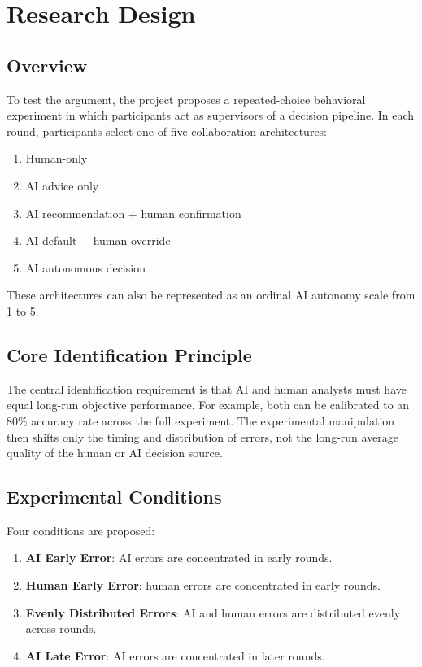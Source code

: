 \section{Research Design}

\subsection{Overview}

To test the argument, the project proposes a repeated-choice behavioral experiment in which participants act as supervisors of a decision pipeline. In each round, participants select one of five collaboration architectures:

\begin{enumerate}[label=\arabic*.]
    \item Human-only
    \item AI advice only
    \item AI recommendation + human confirmation
    \item AI default + human override
    \item AI autonomous decision
\end{enumerate}

These architectures can also be represented as an ordinal AI autonomy scale from 1 to 5.

\subsection{Core Identification Principle}

The central identification requirement is that AI and human analysts must have equal long-run objective performance. For example, both can be calibrated to an 80\% accuracy rate across the full experiment. The experimental manipulation then shifts only the timing and distribution of errors, not the long-run average quality of the human or AI decision source.

\subsection{Experimental Conditions}

Four conditions are proposed:

\begin{enumerate}[label=\arabic*.]
    \item \textbf{AI Early Error}: AI errors are concentrated in early rounds.
    \item \textbf{Human Early Error}: human errors are concentrated in early rounds.
    \item \textbf{Evenly Distributed Errors}: AI and human errors are distributed evenly across rounds.
    \item \textbf{AI Late Error}: AI errors are concentrated in later rounds.
\end{enumerate}

